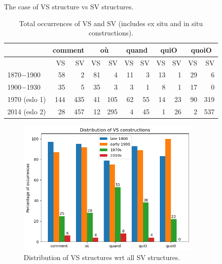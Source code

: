 \documentclass[fleqn,10pt]{wlscirep}
\begin{document}
The case of VS structure vs SV structures.

\begin{table}[H]
    \centering
    \small
    \begin{adjustbox}{width=\textwidth}
        \begin{tabular}{l|rr|rr|rr|rr|rr}
        {} & \multicolumn{2}{c}{comment}  & \multicolumn{2}{c}{où} & \multicolumn{2}{c}{quand} & \multicolumn{2}{c}{quiO}& \multicolumn{2}{c}{quoiO}\\
        \hline
        {} & VS & SV & VS & SV & VS & SV & VS & SV & VS & SV\\
        1870$-$1900 & 58 & 2 & 81 & 4 & 11 & 3 & 13 & 1 & 29 & 6\\
        1900$-$1930 & 35 & 5 & 35 & 3 & 3 & 1 & 8 & 1 & 17 & 0\\
        1970 (eslo 1) & 144 & 435 & 41 & 105 & 62 & 55 & 14 & 23 & 90 & 319 \\
        2014 (eslo 2) & 28 & 457 & 12 & 295 & 4 & 45 & 1 & 26 & 2 & 537 \\
        \hline
        \end{tabular}
    \end{adjustbox}
\caption{\label{tab:samp6}Total occurrences of VS and SV (includes ex situ and in situ constructions).}
\end{table}

\begin{figure}[h!]
    \centering
    \includegraphics[width=90mm]{images/VS.png}
    \caption{Distribution of VS structures wrt all SV structures.}
    \label{fig:boat1}
  \end{figure}
\end{document}
